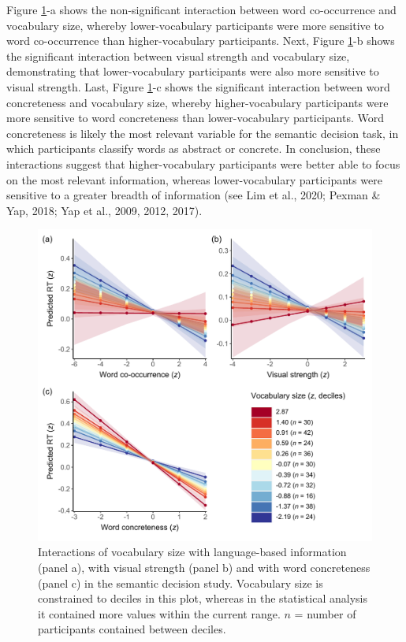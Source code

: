 \documentclass[
  12pt,
  man,floatsintext]{apa7}
\begin{document}
Figure \ref{fig:semanticdecision-interactions-with-vocabulary-size}-a shows the non-significant interaction between word co-occurrence and vocabulary size, whereby lower-vocabulary participants were more sensitive to word co-occurrence than higher-vocabulary participants. Next, Figure \ref{fig:semanticdecision-interactions-with-vocabulary-size}-b shows the significant interaction between visual strength and vocabulary size, demonstrating that lower-vocabulary participants were also more sensitive to visual strength. Last, Figure \ref{fig:semanticdecision-interactions-with-vocabulary-size}-c shows the significant interaction between word concreteness and vocabulary size, whereby higher-vocabulary participants were more sensitive to word concreteness than lower-vocabulary participants. Word concreteness is likely the most relevant variable for the semantic decision task, in which participants classify words as abstract or concrete. In conclusion, these interactions suggest that higher-vocabulary participants were better able to focus on the most relevant information, whereas lower-vocabulary participants were
sensitive to a greater breadth of information (see Lim et al., 2020; Pexman \& Yap, 2018; Yap et al., 2009, 2012, 2017).



\begin{figure}

{\centering \includegraphics[width=0.98\linewidth]{../semanticdecision/frequentist_analysis/plots/semanticdecision-interactions-with-vocabulary-size} 

}

\caption{Interactions of vocabulary size with language-based information (panel a), with visual strength (panel b) and with word concreteness (panel c) in the semantic decision study. Vocabulary size is constrained to deciles in this plot, whereas in the statistical analysis it contained more values within the current range. \(n\) = number of participants contained between deciles.}\label{fig:semanticdecision-interactions-with-vocabulary-size}
\end{figure}
\end{document}
